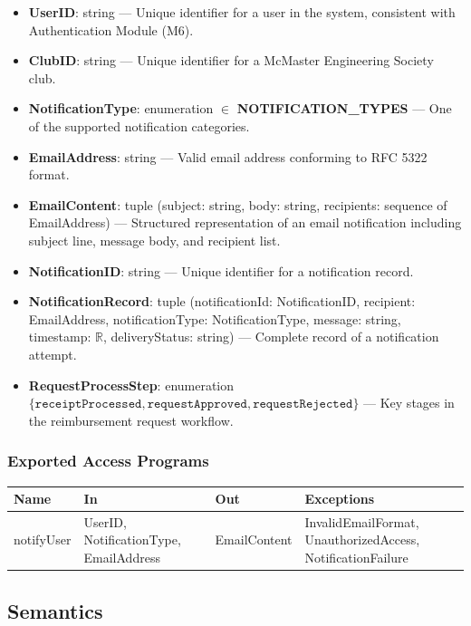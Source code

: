 \documentclass[12pt, titlepage]{article}
\begin{document}
\begin{itemize}
  \item \textbf{UserID}: string --- Unique identifier for a user in the system, consistent with Authentication Module (M6).
  \item \textbf{ClubID}: string --- Unique identifier for a McMaster Engineering Society club.
  \item \textbf{NotificationType}: enumeration $\in$ \textbf{NOTIFICATION\_TYPES} --- One of the supported notification categories.
  \item \textbf{EmailAddress}: string --- Valid email address conforming to RFC 5322 format.
  \item \textbf{EmailContent}: tuple (subject: string, body: string, recipients: sequence of EmailAddress) --- Structured representation of an email notification including subject line, message body, and recipient list.
  \item \textbf{NotificationID}: string --- Unique identifier for a notification record.
  \item \textbf{NotificationRecord}: tuple (notificationId: NotificationID, recipient: EmailAddress, notificationType: NotificationType, message: string, timestamp: $\mathbb{R}$, deliveryStatus: string) --- Complete record of a notification attempt.
  \item \textbf{RequestProcessStep}: enumeration $\{\texttt{receiptProcessed}, \texttt{requestApproved}, \texttt{requestRejected}\}$ --- Key stages in the reimbursement request workflow.
\end{itemize}

\subsubsection{Exported Access Programs}

\begin{center}
\begin{tabular}{p{2.8cm} p{3.4cm} p{2.8cm} p{5.6cm}}
\toprule
\textbf{Name} & \textbf{In} & \textbf{Out} & \textbf{Exceptions} \\
\midrule
notifyUser & UserID, NotificationType, EmailAddress & EmailContent & InvalidEmailFormat, UnauthorizedAccess, NotificationFailure \\
\bottomrule
\end{tabular}
\end{center}

\subsection{Semantics}
\end{document}
